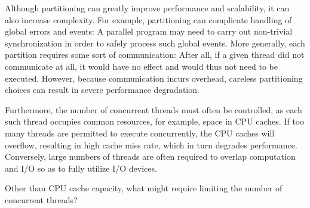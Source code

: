 Although partitioning can greatly improve performance and scalability,
it can also increase complexity.
For example, partitioning can complicate handling of global
errors and events: A parallel
program may need to carry out non-trivial synchronization in order
to safely process such global events.
More generally, each partition requires some sort of communication:
After all, if
a given thread did not communicate at all, it would have no effect and
would thus not need to be executed.
However, because communication incurs overhead, careless partitioning choices
can result in severe performance degradation.

Furthermore, the number of concurrent threads must often be controlled,
as each such thread occupies common resources, for example,
space in CPU caches.
If too many threads are permitted to execute concurrently, the
CPU caches will overflow, resulting in high cache miss rate, which in
turn degrades performance.
Conversely, large numbers of threads are often required to
overlap computation and I/O so as to fully utilize I/O devices.

\QuickQuiz{}
	Other than CPU cache capacity, what might require limiting the
	number of concurrent threads?
 \QuickQuizEnd

